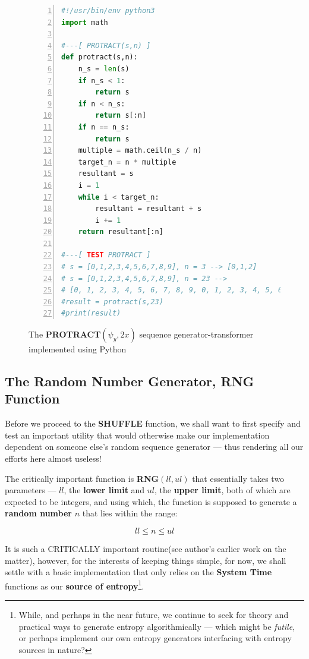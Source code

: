 \documentclass[a4paper, 18pt]{book} %
\begin{document}
\begin{figure}[H]
  \begin{center}
  \begin{lstlisting}[caption={The PROTRACT}, label={LST_PROTRACT}, language=Python, frame=single, numbers=left, basicstyle=\ttfamily,  commentstyle=\color{blue}]
#!/usr/bin/env python3
import math

#---[ PROTRACT(s,n) ]
def protract(s,n):
    n_s = len(s)
    if n_s < 1:
        return s
    if n < n_s:
        return s[:n]
    if n == n_s:
        return s
    multiple = math.ceil(n_s / n)
    target_n = n * multiple
    resultant = s
    i = 1
    while i < target_n:
        resultant = resultant + s
        i += 1
    return resultant[:n]

#---[ TEST PROTRACT ]
# s = [0,1,2,3,4,5,6,7,8,9], n = 3 --> [0,1,2]
# s = [0,1,2,3,4,5,6,7,8,9], n = 23 -->
# [0, 1, 2, 3, 4, 5, 6, 7, 8, 9, 0, 1, 2, 3, 4, 5, 6, 7, 8, 9, 0, 1, 2]
#result = protract(s,23)
#print(result)
\end{lstlisting}
  \end{center}
  \caption{The \textbf{PROTRACT}$(\psi_y, 2x)$ sequence generator-transformer implemented using Python}
\end{figure}


\subsection{The Random Number Generator, RNG Function}

Before we proceed to the \textbf{SHUFFLE} function, we shall want to first specify and test an important utility that would otherwise make our implementation dependent on someone else's random sequence generator --- thus rendering all our efforts here almost useless!

The critically important function is \textbf{RNG}$(ll,ul)$ that essentially takes two parameters --- $ll$, the \textbf{lower limit} and $ul$, the \textbf{upper limit}, both of which are expected to be integers, and using which, the function is supposed to generate a \textbf{random number} $n$ that lies within the range:

\begin{equation}
ll \leq n \leq ul
\end{equation}

It is such a CRITICALLY important routine(see author's earlier work on the matter\cite{lnspaper}), however, for the interests of keeping things simple, for now, we shall settle with a basic implementation that only relies on the \textbf{System Time} functions as our \textbf{source of entropy}\footnote{While, and perhaps in the near future, we continue to seek for theory and practical ways to generate entropy algorithmically --- which might be \textit{futile}, or perhaps implement our own entropy generators interfacing with entropy sources in nature?}.
\end{document}
